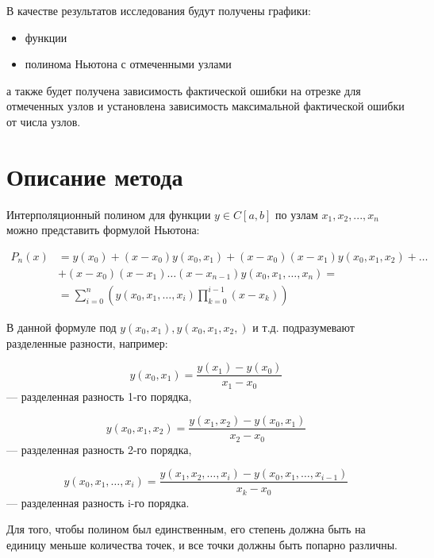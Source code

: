 \documentclass{article}
\begin{document}
В качестве результатов исследования будут получены графики:

\begin{itemize}[label=$\cdot$]
    \item функции
    \item полинома Ньютона с отмеченными узлами
\end{itemize}

а также будет получена зависимость фактической ошибки на отрезке для отмеченных узлов и установлена зависимость максимальной фактической ошибки от числа узлов.

\section{Описание метода}

Интерполяционный полином для функции $y \in C[a, b]$ по узлам
$x_1, x_2, ... ,\allowbreak x_n$ можно представить формулой Ньютона:

\begin{equation}
\begin{split}
P_n(x) &= y(x_0) + (x - x_0) y(x_0, x_1) + (x - x_0)(x - x_1) y(x_0, x_1, x_2) + \dots \\
& + (x - x_0)(x - x_1) \dots (x - x_{n-1}) y(x_0, x_1, \dots, x_n) = \\
& = \sum_{i=0}^{n} (y(x_0, x_1, \dots, x_i) \prod_{k=0}^{i-1} (x - x_k))
\end{split}
\end{equation}

В данной формуле под $y(x_0,x_1), y(x_0,x_1,x_2,)$ и т.д. подразумевают разделенные разности, например:

\begin{equation}
y(x_0,x_1) = \frac{y(x_1) - y(x_0)}{x_1-x_0}
\end{equation} --- разделенная разность 1-го порядка,

\begin{equation}
y(x_0,x_1,x_2) = \frac{y(x_1,x_2) - y(x_0,x_1)}{x_2-x_0}
\end{equation} --- разделенная разность 2-го порядка,

\begin{equation}
y(x_0,x_1,\dots,x_i) = \frac{y(x_1,x_2,\dots,x_i) - y(x_0,x_1,\dots,x_{i-1})}{x_k-x_0}
\end{equation} --- разделенная разность i-го порядка.

Для того, чтобы полином был единственным, его степень должна быть на
единицу меньше количества точек, и все точки должны быть попарно различны.
\end{document}
